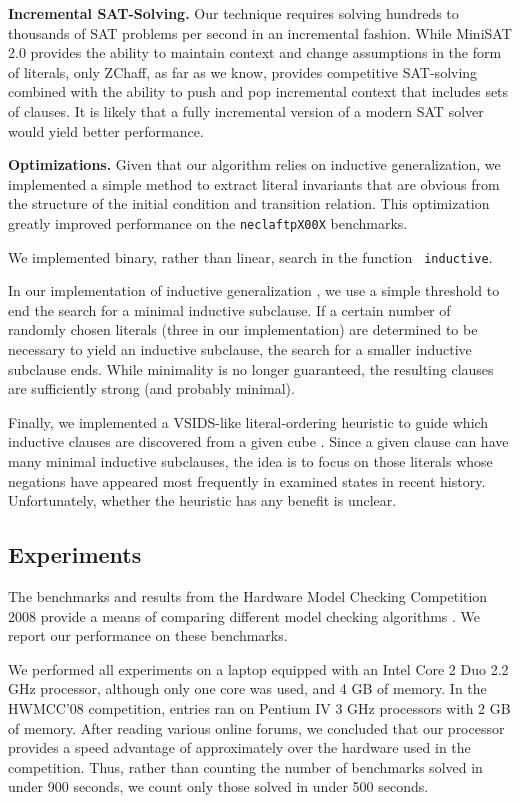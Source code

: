 \documentclass{llncs}
\begin{document}
{\bf Incremental SAT-Solving.}  Our technique requires solving
hundreds to thousands of SAT problems per second in an incremental
fashion.  While MiniSAT 2.0 provides the ability to maintain context
and change assumptions in the form of literals, only ZChaff, as far as
we know, provides competitive SAT-solving combined with the ability to
push and pop incremental context that includes sets of clauses.  It is
likely that a fully incremental version of a modern SAT solver would
yield better performance.

{\bf Optimizations.}  Given that our algorithm relies on inductive
generalization, we implemented a simple method to extract literal
invariants that are obvious from the structure of the initial
condition and transition relation.  This optimization greatly improved
performance on the {\tt neclaftpX00X} benchmarks.

We implemented binary, rather than linear, search in the function {\tt
  inductive}.

In our implementation of inductive generalization
\cite{Bradley+Manna/2007}, we use a simple threshold to end the search
for a minimal inductive subclause.  If a certain number of randomly
chosen literals (three in our implementation) are determined to be
necessary to yield an inductive subclause, the search for a smaller
inductive subclause ends.  While minimality is no longer guaranteed,
the resulting clauses are sufficiently strong (and probably minimal).

Finally, we implemented a VSIDS-like literal-ordering heuristic to
guide which inductive clauses are discovered from a given cube
\cite{Moskewicz+Others/2001}.  Since a given clause can have many
minimal inductive subclauses, the idea is to focus on those literals
whose negations have appeared most frequently in examined states in
recent history.  Unfortunately, whether the heuristic has any benefit
is unclear.





\subsection{Experiments}

The benchmarks and results from the Hardware Model Checking
Competition 2008 provide a means of comparing different model checking
algorithms \cite{hwmcc08}.  We report our performance on these
benchmarks.

We performed all experiments on a laptop equipped with an Intel Core 2
Duo 2.2 GHz processor, although only one core was used, and 4 GB of
memory.  In the HWMCC'08 competition, entries ran on Pentium IV 3 GHz
processors with 2 GB of memory.  After reading various online forums,
we concluded that our processor provides a speed advantage of
approximately  over the hardware used in the competition.
Thus, rather than counting the number of benchmarks solved in under
900 seconds, we count only those solved in under 500 seconds.
\end{document}
